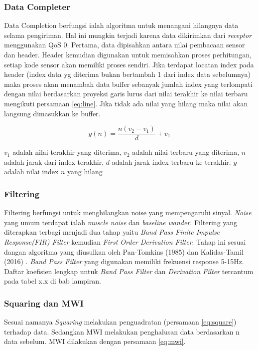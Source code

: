 \subsubsection{Data Completer}
Data Completion berfungsi ialah algoritma untuk menangani hilangnya data selama pengiriman. Hal ini mungkin terjadi karena data dikirimkan dari \textit{receptor} menggunakan QoS 0. Pertama, data dipisahkan antara nilai pembacaan sensor dan header. Header kemudian digunakan untuk memisahkan proses perhitungan, setiap kode sensor akan memiliki proses sendiri. Jika terdapat locatan index pada header (index data yg diterima bukan bertambah 1 dari index data sebelumnya) maka proses akan menambah data buffer sebanyak jumlah index yang terlompati dengan nilai berdasarkan proyeksi garis lurus dari nilai terakhir ke nilai terbaru mengikuti persamaan \ref{eq:line}. Jika tidak ada nilai yang hilang maka nilai akan langsung dimasukkan ke buffer.

\begin{equation}
y(n) = \dfrac{n (v_{2} - v_{1})}{d} + v_{1}
\label{eq:line}
\end{equation}

$v_{1}$ adalah nilai terakhir yang diterima, $v_{2}$ adalah nilai terbaru yang diterima, $n$ adalah jarak dari index terakhir, $d$ adalah jarak index terbaru ke terakhir. $y$ adalah nilai index $n$ yang hilang

\subsubsection{Filtering}
Filtering berfungsi untuk menghilangkan noise yang mempengaruhi sinyal. \textit{Noise} yang umum terdapat ialah \textit{muscle noise} dan \textit{baseline wander}. Filtering yang diterapkan terbagi menjadi dua tahap yaitu \textit{Band Pass Finite Impulse Response(FIR) Filter} kemudian \textit{First Order Derivation Filter}. Tahap ini sesuai dangan algoritma yang diusulkan oleh Pan-Tomkins (1985)\cite{pantom} dan Kalidas-Tamil (2016) \cite{ecg_syncro}. \textit{Band Pass Filter} yang digunakan memiliki frekuensi response 5-15Hz. Daftar koefisien lengkap untuk \textit{Band Pass Filter} dan \textit{Derivation Filter} tercantum pada tabel x.x di bab lampiran.

\subsubsection{Squaring dan MWI}
Sesuai namanya \textit{Squaring} melakukan penguadratan (persamaan \ref{eq:square}) terhadap data. Sedangkan MWI melakukan penghalusan data berdasarkan n data sebelum. MWI dilakukan dengan persamaan \ref{eq:mwi}.

